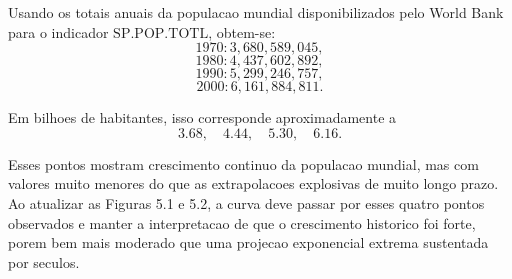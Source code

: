 Usando os totais anuais da populacao mundial disponibilizados pelo World Bank para o indicador $\mathrm{SP.POP.TOTL}$, obtem-se:
\[
1970: 3{,}680{,}589{,}045,
\]
\[
1980: 4{,}437{,}602{,}892,
\]
\[
1990: 5{,}299{,}246{,}757,
\]
\[
2000: 6{,}161{,}884{,}811.
\]

Em bilhoes de habitantes, isso corresponde aproximadamente a
\[
3.68,\quad 4.44,\quad 5.30,\quad 6.16.
\]

Esses pontos mostram crescimento continuo da populacao mundial, mas com valores muito menores do que as extrapolacoes explosivas de muito longo prazo. Ao atualizar as Figuras 5.1 e 5.2, a curva deve passar por esses quatro pontos observados e manter a interpretacao de que o crescimento historico foi forte, porem bem mais moderado que uma projecao exponencial extrema sustentada por seculos.